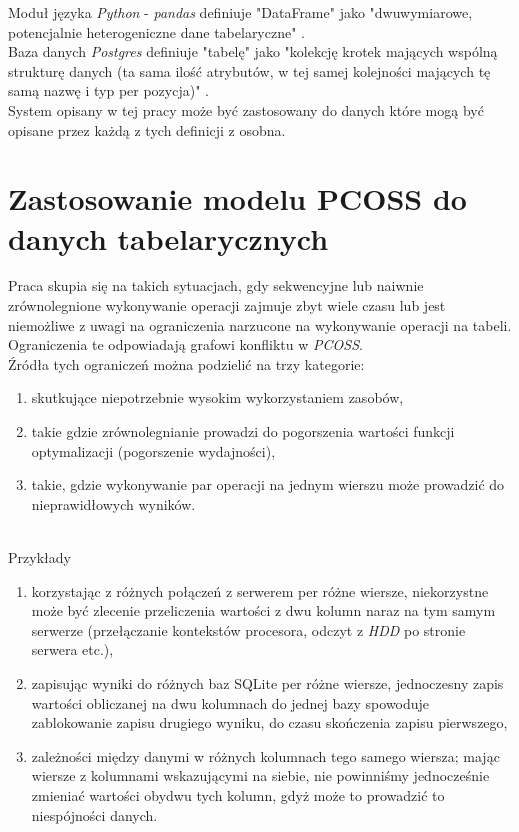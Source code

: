 \documentclass[brudnopis]{xmgr}
\begin{document}
Moduł języka \emph{Python} - \emph{pandas} definiuje "DataFrame" jako "dwuwymiarowe, potencjalnie heterogeniczne dane tabelaryczne" \cite{P:DF}.
\medskip\\

Baza danych \emph{Postgres} definiuje "tabelę" jako "kolekcję krotek mających wspólną strukturę danych (ta sama ilość atrybutów, w tej samej kolejności mających tę samą nazwę i typ per pozycja)" \cite{PSQL:TAB}.
\medskip\\

System opisany w tej pracy może być zastosowany do danych które mogą być opisane przez każdą z tych definicji z osobna.

\chapter{Zastosowanie modelu PCOSS do danych tabelarycznych}

Praca skupia się na takich sytuacjach, gdy sekwencyjne lub naiwnie zrównolegnione wykonywanie operacji zajmuje zbyt wiele czasu lub jest niemożliwe z uwagi na ograniczenia narzucone na wykonywanie operacji na tabeli.
Ograniczenia te odpowiadają grafowi konfliktu w \emph{PCOSS}.
\medskip\\

Źródła tych ograniczeń można podzielić na trzy kategorie:
\begin{enumerate}
    \item skutkujące niepotrzebnie wysokim wykorzystaniem zasobów,
    \item takie gdzie zrównolegnianie prowadzi do pogorszenia wartości funkcji optymalizacji (pogorszenie wydajności),
    \item takie, gdzie wykonywanie par operacji na jednym wierszu może prowadzić do nieprawidłowych wyników.
\end{enumerate}
\medskip\\

Przykłady
\begin{enumerate}
    \item korzystając z różnych połączeń z serwerem per różne wiersze, niekorzystne może być zlecenie przeliczenia wartości z dwu kolumn naraz na tym samym serwerze (przełączanie kontekstów procesora, odczyt z \emph{HDD} po stronie serwera etc.),
    \item zapisując wyniki do różnych baz SQLite per różne wiersze, jednoczesny zapis wartości obliczanej na dwu kolumnach do jednej bazy spowoduje zablokowanie zapisu drugiego wyniku, do czasu skończenia zapisu pierwszego,
    \item zależności między danymi w różnych kolumnach tego samego wiersza; mając wiersze z kolumnami wskazującymi na siebie, nie powinniśmy jednocześnie zmieniać wartości obydwu tych kolumn, gdyż może to prowadzić to niespójności danych.
\end{enumerate}
\medskip\\
\end{document}
